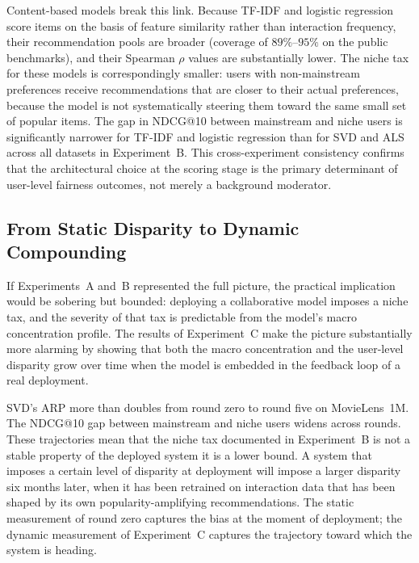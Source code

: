 \documentclass[11pt,a4paper]{report}
\begin{document}
Content-based models break this link. Because TF-IDF and logistic regression score items on the basis of feature similarity rather than interaction frequency, their recommendation pools are broader (coverage of $89\%$--$95\%$ on the public benchmarks), and their Spearman $\rho$ values are substantially lower. The niche tax for these models is correspondingly smaller: users with non-mainstream preferences receive recommendations that are closer to their actual preferences, because the model is not systematically steering them toward the same small set of popular items. The gap in NDCG@10 between mainstream and niche users is significantly narrower for TF-IDF and logistic regression than for SVD and ALS across all datasets in Experiment~B. This cross-experiment consistency confirms that the architectural choice at the scoring stage is the primary determinant of user-level fairness outcomes, not merely a background moderator.

\subsection*{From Static Disparity to Dynamic Compounding}

If Experiments~A and~B represented the full picture, the practical implication would be sobering but bounded: deploying a collaborative model imposes a niche tax, and the severity of that tax is predictable from the model's macro concentration profile. The results of Experiment~C make the picture substantially more alarming by showing that both the macro concentration and the user-level disparity grow over time when the model is embedded in the feedback loop of a real deployment.

SVD's ARP more than doubles from round zero to round five on MovieLens~1M. The NDCG@10 gap between mainstream and niche users widens across rounds. These trajectories mean that the niche tax documented in Experiment~B is not a stable property of the deployed system it is a lower bound. A system that imposes a certain level of disparity at deployment will impose a larger disparity six months later, when it has been retrained on interaction data that has been shaped by its own popularity-amplifying recommendations. The static measurement of round zero captures the bias at the moment of deployment; the dynamic measurement of Experiment~C captures the trajectory toward which the system is heading.
\end{document}
